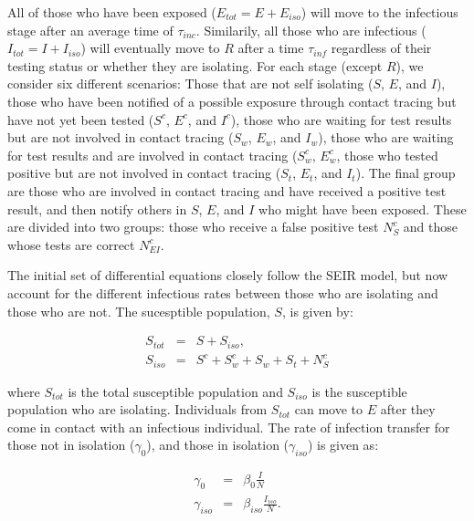 \documentclass[notitlepage, superscriptaddress]{revtex4-2}
\begin{document}
All of those who have been exposed ($E_{tot} = E + E_{iso}$) will move to the infectious stage after an average time of $\tau_{inc}$. Similarily, all those who are infectious ($I_{tot} =  I + I_{iso}$) will eventually move to $R$ after a time $\tau_{inf}$ regardless of their testing status or whether they are isolating. For each stage (except $R$), we consider six different scenarios: Those that are not self isolating ($S$, $E$, and $I$), those who have been notified of a possible exposure through contact tracing but have not yet been tested ($S^{c}$, $E^{c}$, and $I^{c}$), those who are waiting for test results but are not involved in contact tracing ($S_{w}$, $E_{w}$, and $I_{w}$), those who are waiting for test results and are involved in contact tracing ($S^{c}_{w}$, $E^{c}_{w}$, those who tested positive but are not involved in contact tracing ($S_{t}$, $E_{t}$, and $I_{t}$). The final group are those who are involved in contact tracing and have received a positive test result, and then notify others in $S$, $E$, and $I$ who might have been exposed. These are divided into two groups: those who receive a false positive test $N^{c}_{S}$ and those whose tests are correct $N^{c}_{EI}$. 

The initial set of differential equations closely follow the SEIR model, but now account for the different infectious rates between those who are isolating and those who are not. The sucesptible population, $S$, is given by:

\begin{eqnarray}
\label{E:Stot}
S_{tot} &=& S + S_{iso}, \\ 
S_{iso} &=& S^{c} + S^{c}_{w} + S_{w} + S_{t} + N^{c}_{S}
\end{eqnarray}

where $S_{tot}$ is the total susceptible population and $S_{iso}$ is the susceptible population who are isolating. Individuals from $S_{tot}$ can move to $E$ after they come in contact with an infectious individual. The rate of infection transfer for those not in isolation ($\gamma_{0}$), and those in isolation ($\gamma_{iso}$) is given as:

\begin{eqnarray}
\label{E:infectionrates}
\gamma_{0} &=& \beta_0 \frac{I}{N} \\ 
\gamma_{iso} &=& \beta_{iso} \frac{I_{iso}}{N}.
\end{eqnarray}
\end{document}
